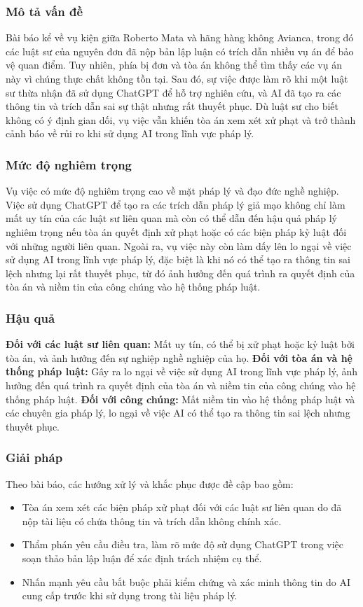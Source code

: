 \subsubsection{Mô tả vấn đề}
Bài báo kể về vụ kiện giữa Roberto Mata và hãng hàng không Avianca, trong đó các luật sư của nguyên đơn đã nộp bản lập luận có trích dẫn nhiều vụ án để bảo vệ quan điểm. Tuy nhiên, phía bị đơn và tòa án không thể tìm thấy các vụ án này vì chúng thực chất không tồn tại. Sau đó, sự việc được làm rõ khi một luật sư thừa nhận đã sử dụng ChatGPT để hỗ trợ nghiên cứu, và AI đã tạo ra các thông tin và trích dẫn sai sự thật nhưng rất thuyết phục. Dù luật sư cho biết không có ý định gian dối, vụ việc vẫn khiến tòa án xem xét xử phạt và trở thành cảnh báo về rủi ro khi sử dụng AI trong lĩnh vực pháp lý.

\subsubsection{Mức độ nghiêm trọng}
Vụ việc có mức độ nghiêm trọng cao về mặt pháp lý và đạo đức nghề nghiệp. Việc sử dụng ChatGPT để tạo ra các trích dẫn pháp lý giả mạo không chỉ làm mất uy tín của các luật sư liên quan mà còn có thể dẫn đến hậu quả pháp lý nghiêm trọng nếu tòa án quyết định xử phạt hoặc có các biện pháp kỷ luật đối với những người liên quan. Ngoài ra, vụ việc này còn làm dấy lên lo ngại về việc sử dụng AI trong lĩnh vực pháp lý, đặc biệt là khi nó có thể tạo ra thông tin sai lệch nhưng lại rất thuyết phục, từ đó ảnh hưởng đến quá trình ra quyết định của tòa án và niềm tin của công chúng vào hệ thống pháp luật.

\subsubsection{Hậu quả}
\textbf{Đối với các luật sư liên quan:} Mất uy tín, có thể bị xử phạt hoặc kỷ luật bởi tòa án, và ảnh hưởng đến sự nghiệp nghề nghiệp của họ.
\textbf{Đối với tòa án và hệ thống pháp luật:} Gây ra lo ngại về việc sử dụng AI trong lĩnh vực pháp lý, ảnh hưởng đến quá trình ra quyết định của tòa án và niềm tin của công chúng vào hệ thống pháp luật.
\textbf{Đối với công chúng:} Mất niềm tin vào hệ thống pháp luật và các chuyên gia pháp lý, lo ngại về việc AI có thể tạo ra thông tin sai lệch nhưng thuyết phục.

\subsubsection{Giải pháp}
Theo bài báo, các hướng xử lý và khắc phục được đề cập bao gồm:
\begin{itemize}
    \item Tòa án xem xét các biện pháp xử phạt đối với các luật sư liên quan do đã nộp tài liệu có chứa thông tin và trích dẫn không chính xác.
    \item Thẩm phán yêu cầu điều tra, làm rõ mức độ sử dụng ChatGPT trong việc soạn thảo bản lập luận để xác định trách nhiệm cụ thể.
    \item Nhấn mạnh yêu cầu bắt buộc phải kiểm chứng và xác minh thông tin do AI cung cấp trước khi sử dụng trong tài liệu pháp lý.
\end{itemize}

